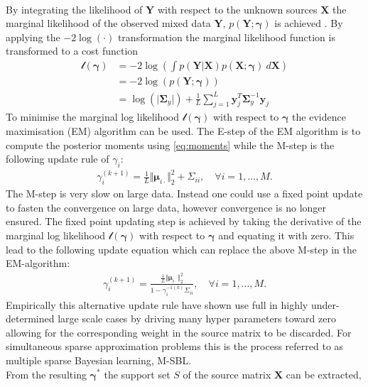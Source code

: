 \\
By integrating the likelihood of $\textbf{Y}$ with respect to the unknown sources $\mathbf{X}$ the marginal likelihood of the observed mixed data $\mathbf{Y}$, $p (\mathbf{Y} ; \boldsymbol{\gamma})$ is achieved \cite[p. 146]{phd_wipf}. By applying the $-2 \log (\cdot)$ transformation the marginal likelihood function is transformed to a cost function
\begin{align*}
\mathcal{l}(\boldsymbol{\gamma}) &= -2 \log \left( \int p (\mathbf{Y}  \vert \mathbf{X}) p (\mathbf{X} ; \boldsymbol{\gamma}) \ d\mathbf{X} \right) \\
&= - 2 \log(p (\mathbf{Y} ; \boldsymbol{\gamma}))\\
&= \log ( \vert \boldsymbol{\Sigma}_y \vert) + \frac{1}{L} \sum_{j=1}^L \mathbf{y}_{j}^T \boldsymbol{\Sigma}_y ^{-1} \mathbf{y}_{j}
\end{align*}
To minimise the marginal log likelihood $\mathcal{l}(\boldsymbol{\gamma})$ with respect to $\boldsymbol{\gamma}$ the evidence maximisation (EM) algorithm can be used. The E-step of the EM algorithm is to compute the posterior moments using \eqref{eq:moments} while the M-step is the following update rule of $\gamma_i$:
\begin{align*}
\gamma_i^{(k+1)} = \frac{1}{L} \Vert \boldsymbol{\mu}_{i \cdot} \Vert_2^2 + \Sigma_{ii}, \quad \forall i = 1, \dots, M.
\end{align*}
The M-step is very slow on large data. Instead one could use a fixed point update to fasten the convergence on large data, however convergence is no longer ensured. The fixed point updating step is achieved by taking the derivative of the marginal log likelihood $\mathcal{l}(\boldsymbol{\gamma})$ with respect to $\boldsymbol{\gamma}$ and equating it with zero. This lead to the following update equation which can replace the above M-step in the EM-algorithm:
\begin{align*}
\gamma_i^{(k+1)} = \frac{\frac{1}{L} \Vert \boldsymbol{\mu}_{i \cdot} \Vert_2^2}{1 - \gamma_i^{-1 (k)} \Sigma_{ii}}, \quad \forall i = 1, \dots, M.
\end{align*}
Empirically this alternative update rule have shown use full in highly under-determined large scale cases by driving many hyper parameters toward zero allowing for the corresponding weight in the source matrix to be discarded. For simultaneous sparse approximation problems this is the process referred to as multiple sparse Bayesian learning, M-SBL.\\
From the resulting $\boldsymbol{\gamma}^\ast$ the support set $S$ of the source matrix $\textbf{X}$ can be extracted, 
